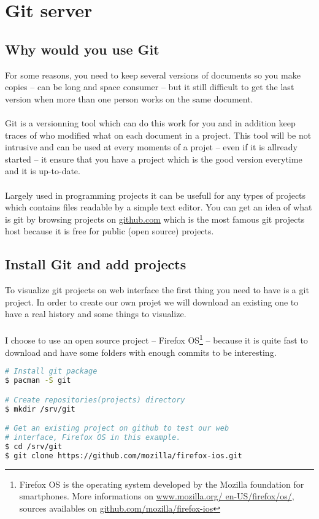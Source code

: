 
\chapter{Git server}
\section{Why would you use Git}
For some reasons, you need to keep several versions of documents so you make 
copies -- can be long and space consumer -- but it still difficult to get the 
last version when more than one person works on the same document.
\\\\
Git is a versionning tool which can do this work for you and in addition keep 
traces of who modified what on each document in a project. This tool will be not  
intrusive and can be used at every moments of a projet -- even if it is allready 
started -- it ensure that you have a project which is the \og{}good version\fg{} 
everytime and it is up-to-date.
\\\\
Largely used in programming projects it can be usefull for any types of projects 
which contains files readable by a simple text editor. You can get an idea of what 
is git by browsing projects on \href{http://github.com}{github.com} which is the 
most famous git projects host because it is free for public (open source) projects.

\section{Install Git and add projects}
To visualize git projects on web interface the first thing you need to have is a 
git project. In order to create our own projet we will download an existing one 
to have a real history and some things to visualize. 
\\\\
I choose to use an open source project -- Firefox OS\footnote{Firefox OS is the 
operating system developed by the Mozilla foundation for smartphones. More 
informations on \href{https://www.mozilla.org/en-US/firefox/os/}{www.mozilla.org/
en-US/firefox/os/}, sources availables on \href{https://github.com/mozilla/
firefox-ios}{github.com/mozilla/firefox-ios}} -- because it is quite fast to 
download and have some folders with enough commits to be interesting.

\begin{lstlisting}[language=bash,caption=Install git and add projects]
# Install git package
$ pacman -S git

# Create repositories(projects) directory
$ mkdir /srv/git

# Get an existing project on github to test our web 
# interface, Firefox OS in this example.
$ cd /srv/git
$ git clone https://github.com/mozilla/firefox-ios.git
\end{lstlisting}

